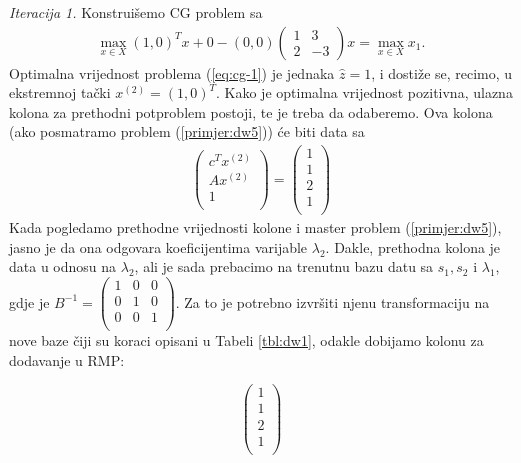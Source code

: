 \documentclass[a4paper, utf8, 11pt, colorlinks]{book}
\theoremstyle{definition}
\begin{document}
\emph{Iteracija 1.} 
Konstruišemo CG problem sa
\begin{align}\label{eq:cg-1}
	 \max_{x \in X} (1, 0)^T x + 0 - (0, 0) \left(\begin{array}{cc}
	 	1 & 3 \\
	 	2 & -3
	 \end{array}\right)  x = \max_{x \in X} x_1. 
\end{align} 
Optimalna vrijednost problema (\ref{eq:cg-1}) je jednaka $\hat{z}=1$, i dostiže se, recimo, u ekstremnoj tački $ x^{(2)}= (1, 0)^T.$ Kako je optimalna vrijednost pozitivna, ulazna kolona za prethodni potproblem postoji, te je treba da odaberemo. Ova kolona (ako posmatramo problem (\ref{primjer:dw5})) će biti data sa 
\begin{align}
     \begin{pmatrix}
     	    c^T  x^{(2)} \\
     	    A x^{(2)}  \\
     	    1     \\
     \end{pmatrix} = \begin{pmatrix}
               1 \\
               1  \\
               2  \\
               1\\
 \end{pmatrix}
\end{align}
Kada pogledamo prethodne vrijednosti kolone i master problem (\ref{primjer:dw5}), jasno je da ona odgovara koeficijentima varijable $\lambda_2$. Dakle, prethodna kolona je data u odnosu na $\lambda_2$, ali je sada prebacimo na trenutnu bazu datu sa $s_1, s_2$ i $\lambda_1$, gdje je $B^{-1} =  \begin{pmatrix}
	1 & 0 & 0 \\
	0 & 1 & 0  \\
	0 & 0 & 1  \\
\end{pmatrix}. $ %
Za to je potrebno izvršiti njenu transformaciju na nove baze čiji su koraci opisani u Tabeli \ref{tbl:dw1}, odakle dobijamo kolonu za dodavanje u RMP:
 
$$	\begin{pmatrix}
	       1 \\
	      1  \\
	      2  \\
	      1\\
	\end{pmatrix}
 $$
\end{document}
